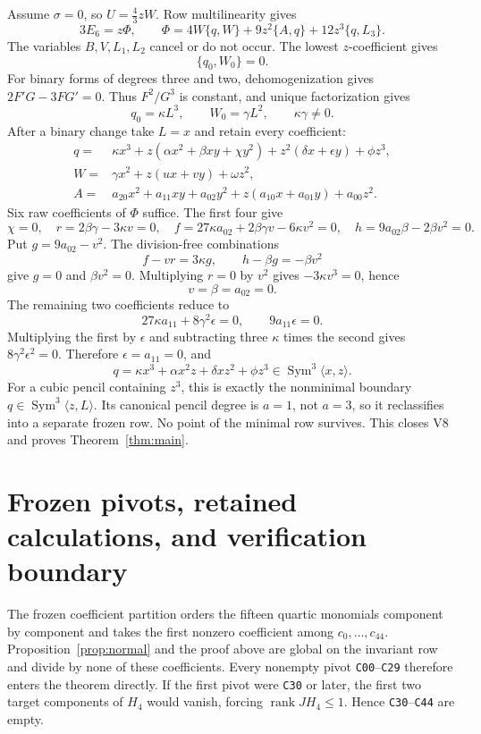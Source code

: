 \documentclass[11pt]{article}
\theoremstyle{remark}
\newcommand{\rank}{\operatorname{rank}}
\newcommand{\Sym}{\operatorname{Sym}}
\begin{document}
Assume $\sigma=0$, so $U=\frac43zW$.  Row multilinearity gives
\begin{equation}
 3E_6=z\Phi,\qquad
 \Phi=4W\{q,W\}+9z^2\{A,q\}+12z^3\{q,L_3\}.
 \label{eq:Phi}
\end{equation}
The variables $B,V,L_1,L_2$ cancel or do not occur.  The lowest
$z$-coefficient gives
\[
 \{q_0,W_0\}=0.
\]
For binary forms of degrees three and two, dehomogenization gives
$2F'G-3FG'=0$.  Thus $F^2/G^3$ is constant, and unique factorization
gives
\begin{equation}
 q_0=\kappa L^3,\qquad W_0=\gamma L^2,\qquad
 \kappa\gamma\ne0.                                   \label{eq:powers}
\end{equation}
After a binary change take $L=x$ and retain every coefficient:
\[
\begin{aligned}
q={}&\kappa x^3+z(\alpha x^2+\beta xy+\chi y^2)
 +z^2(\delta x+\epsilon y)+\phi z^3,\\
W={}&\gamma x^2+z(ux+vy)+\omega z^2,\\
A={}&a_{20}x^2+a_{11}xy+a_{02}y^2
 +z(a_{10}x+a_{01}y)+a_{00}z^2.
\end{aligned}
\]
Six raw coefficients of $\Phi$ suffice.  The first four give
\[
\chi=0,\quad
r=2\beta\gamma-3\kappa v=0,\quad
f=27\kappa a_{02}+2\beta\gamma v-6\kappa v^2=0,\quad
h=9a_{02}\beta-2\beta v^2=0.
\]
Put $g=9a_{02}-v^2$.  The division-free combinations
\[
 f-vr=3\kappa g,\qquad h-\beta g=-\beta v^2
\]
give $g=0$ and $\beta v^2=0$.  Multiplying $r=0$ by $v^2$ gives
$-3\kappa v^3=0$, hence
\[
 v=\beta=a_{02}=0.
\]
The remaining two coefficients reduce to
\[
 27\kappa a_{11}+8\gamma^2\epsilon=0,\qquad
 9a_{11}\epsilon=0.
\]
Multiplying the first by $\epsilon$ and subtracting three $\kappa$ times
the second gives $8\gamma^2\epsilon^2=0$.  Therefore
$\epsilon=a_{11}=0$, and
\[
 q=\kappa x^3+\alpha x^2z+\delta xz^2+\phi z^3
   \in\Sym^3\langle x,z\rangle.
\]
For a cubic pencil containing $z^3$, this is exactly the nonminimal
boundary $q\in\Sym^3\langle z,L\rangle$.  Its canonical pencil degree is
$a=1$, not $a=3$, so it reclassifies into a separate frozen row.  No point
of the minimal row survives.  This closes V8 and proves
Theorem~\ref{thm:main}.

\section{Frozen pivots, retained calculations, and verification boundary}

The frozen coefficient partition orders the fifteen quartic monomials
component by component and takes the first nonzero coefficient among
$c_0,\ldots,c_{44}$.  Proposition~\ref{prop:normal} and the proof above
are global on the invariant row and divide by none of these coefficients.
Every nonempty pivot \texttt{C00}--\texttt{C29} therefore enters the
theorem directly.  If the first pivot were \texttt{C30} or later, the
first two target components of $H_4$ would vanish, forcing
$\rank JH_4\le1$.  Hence \texttt{C30}--\texttt{C44} are empty.
\end{document}
